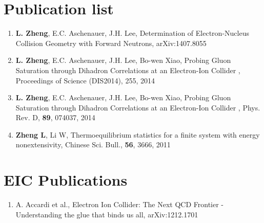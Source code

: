 
\section*{Publication list}

\begin{enumerate}

\item \textbf{L. Zheng}, E.C. Aschenauer, J.H. Lee, Determination of Electron-Nucleus Collision Geometry with Forward Neutrons,
  arXiv:1407.8055
  
\item \textbf{L. Zheng}, E.C. Aschenauer, J.H. Lee, Bo-wen Xiao, Probing Gluon Saturation through Dihadron Correlations at an Electron-Ion Collider ,
  Proceedings of Science (DIS2014), 255, 2014
  
\item \textbf{L. Zheng}, E.C. Aschenauer, J.H. Lee, Bo-wen Xiao, Probing Gluon Saturation through Dihadron Correlations at an Electron-Ion Collider ,
 Phys. Rev. D, \textbf{89}, 074037, 2014
 
\item \textbf{Zheng L}, Li W, Thermoequilibrium statistics for a finite system with energy nonextensivity,
Chinese Sci. Bull., \textbf{56}, 3666, 2011

\end{enumerate}


\section*{EIC Publications}
\begin{enumerate}
\item A. Accardi et al., Electron Ion Collider: The Next QCD Frontier - Understanding the glue that binds us all,
 arXiv:1212.1701
\end{enumerate}


